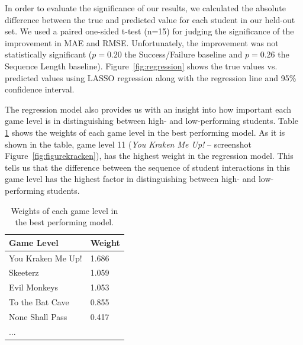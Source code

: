 \documentclass{sigchi}
\begin{document}
	In order to evaluate the significance of our results, we calculated the absolute difference between the true and predicted value for each student in our held-out set.
	We used a paired one-sided t-test (n=15) for judging the significance of the improvement in MAE and RMSE.
	Unfortunately, the improvement was not statistically significant ($p=0.20$ the Success/Failure baseline and $p=0.26$ the Sequence Length baseline). Figure~\ref{fig:regression} shows the true values vs. predicted values using LASSO regression along with the regression line and 95\% confidence interval.
	
	The regression model also provides us with an insight into how important each game level is in distinguishing between high- and low-performing students. Table \ref{tab:regrweights} shows the weights of each game level in the best performing model.
	As it is shown in the table, game level 11 (\textit{You Kraken Me Up!} -- screenshot Figure~\ref{fig:figurekracken}), has the highest weight in the regression model. 
	This tells us that the difference between the sequence of student interactions in this game level has the highest factor in distinguishing between high- and low-performing students.
	
	\begin{table}[b]
		\centering
		\begin{tabular}{ll}
			\hline
			\textbf{Game Level} & \textbf{Weight} \\ \hline
			You Kraken Me Up!   & 1.686                               \\
			Skeeterz            & 1.059                               \\
			Evil Monkeys        & 1.053                               \\
			To the Bat Cave     & 0.855                               \\
			None Shall Pass     & 0.417                               \\
			...                 &                                    
		\end{tabular}
		\caption{Weights of each game level in the best performing model.}
		\label{tab:regrweights}	
	\end{table}
	
\end{document}
